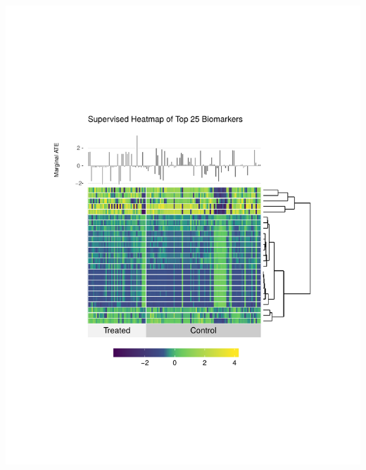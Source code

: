\documentclass[landscape,a0paper,fontscale=0.285]{baposter} %
\newcommand{\1}{\mathbbm{1}}
\begin{document}
\begin{poster}
{\begin{multicols}{2}
\begin{center}
\vspace*{-0.50cm}
\includegraphics[scale=0.47,trim={2cm 6cm 3cm 6.5cm},clip]{supervised_heatmap}
\end{center}


\end{multicols}}
\end{poster}
\end{document}
